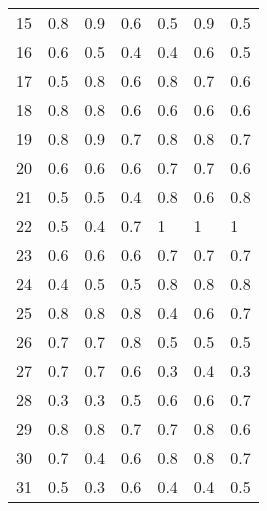 \begin{table}[]
\begin{tabular}{l|lll|lll}
15              & 0.8                  & 0.9       & 0.6     & 0.5     & 0.9 & 0.5     \\
16              & 0.6                  & 0.5       & 0.4     & 0.4     & 0.6 & 0.5     \\
17              & 0.5                  & 0.8       & 0.6     & 0.8     & 0.7 & 0.6     \\
18              & 0.8                  & 0.8       & 0.6     & 0.6     & 0.6 & 0.6     \\
19              & 0.8                  & 0.9       & 0.7     & 0.8     & 0.8 & 0.7     \\
20              & 0.6                  & 0.6       & 0.6     & 0.7     & 0.7 & 0.6     \\
21              & 0.5                  & 0.5       & 0.4     & 0.8     & 0.6 & 0.8     \\
22              & 0.5                  & 0.4       & 0.7     & 1       & 1   & 1       \\
23              & 0.6                  & 0.6       & 0.6     & 0.7     & 0.7 & 0.7     \\
24              & 0.4                  & 0.5       & 0.5     & 0.8     & 0.8 & 0.8     \\
25              & 0.8                  & 0.8       & 0.8     & 0.4     & 0.6 & 0.7     \\
26              & 0.7                  & 0.7       & 0.8     & 0.5     & 0.5 & 0.5     \\
27              & 0.7                  & 0.7       & 0.6     & 0.3     & 0.4 & 0.3     \\
28              & 0.3                  & 0.3       & 0.5     & 0.6     & 0.6 & 0.7     \\
29              & 0.8                  & 0.8       & 0.7     & 0.7     & 0.8 & 0.6     \\
30              & 0.7                  & 0.4       & 0.6     & 0.8     & 0.8 & 0.7     \\
31              & 0.5                  & 0.3       & 0.6     & 0.4     & 0.4 & 0.5     \\
\end{tabular}
\end{table}
\clearpage
